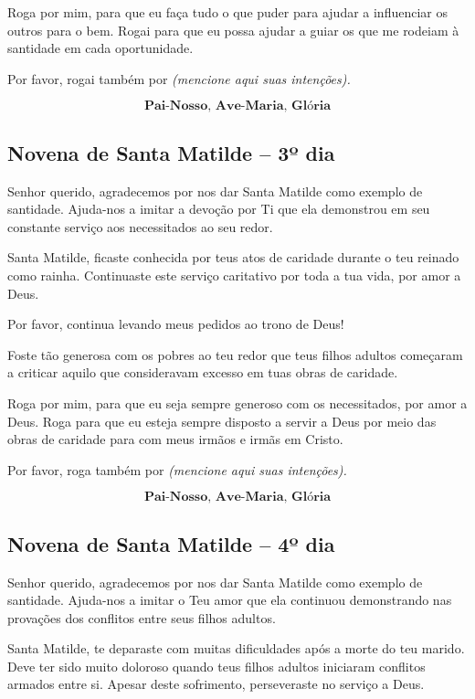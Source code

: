 \documentclass[a4paper,14pt]{extarticle} \usepackage[utf8]{inputenc}
\begin{document}
Roga por mim, para que eu faça tudo o que puder para ajudar a influenciar os outros para o bem. Rogai para que eu possa ajudar a guiar os que me rodeiam à santidade em cada oportunidade.

Por favor, rogai também por \textit{(mencione aqui suas intenções).}

\[\textbf{Pai-Nosso, Ave-Maria, Glória}\]


\subsection{Novena de Santa Matilde – 3º dia}



Senhor querido, agradecemos por nos dar Santa Matilde como exemplo de santidade. Ajuda-nos a imitar a devoção por Ti que ela demonstrou em seu constante serviço aos necessitados ao seu redor.

Santa Matilde, ficaste conhecida por teus atos de caridade durante o teu reinado como rainha. Continuaste este serviço caritativo por toda a tua vida, por amor a Deus.

Por favor, continua levando meus pedidos ao trono de Deus!

Foste tão generosa com os pobres ao teu redor que teus filhos adultos começaram a criticar aquilo que consideravam excesso em tuas obras de caridade.

Roga por mim, para que eu seja sempre generoso com os necessitados, por amor a Deus. Roga para que eu esteja sempre disposto a servir a Deus por meio das obras de caridade para com meus irmãos e irmãs em Cristo.

Por favor, roga também por \textit{(mencione aqui suas intenções).}

\[\textbf{Pai-Nosso, Ave-Maria, Glória}\]


\subsection{Novena de Santa Matilde – 4º dia}



Senhor querido, agradecemos por nos dar Santa Matilde como exemplo de santidade. Ajuda-nos a imitar o Teu amor que ela continuou demonstrando nas provações dos conflitos entre seus filhos adultos.

Santa Matilde, te deparaste com muitas dificuldades após a morte do teu marido. Deve ter sido muito doloroso quando teus filhos adultos iniciaram conflitos armados entre si. Apesar deste sofrimento, perseveraste no serviço a Deus.
\end{document}
